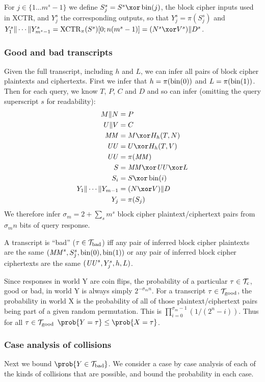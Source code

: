 \documentclass[hctr.tex]{subfiles}
\begin{document}
For \(j \in \{1 \ldots m^s-1\}\) we define \(S_j^s = S^s \xor \fromint(j)\),
the block cipher inputs used in XCTR, and \(Y_j^s\) the corresponding
outputs, so that \(Y_j^s = \pi(S_j^s)\) and 
\(Y_1^s \Concat \cdots \Concat Y_{m^s-1}^s = \XCTR_\pi(S^s)[0;n(m^s -1)] 
= (N^s \xor V^s) \Concat D^s\).

\subsubsection{Good and bad transcripts}
Given the full transcript, including \(h\) and \(L\),
we can infer all pairs of block cipher plaintexts and ciphertexts.
First we infer that \(h = \pi(\operatorname{bin}(0))\) and \(L = \pi(\operatorname{bin}(1))\).
Then for each query, we know \(T\), \(P\), \(C\) and \(D\)
and so can infer
(omitting the query superscript \(s\) for readability):
\begin{align*}
    M \Concat N &= P \\
    U \Concat V &= C \\
    \MM &= M \xor H_h(T, N)\\
    \UU &= U \xor H_h(T, V)\\
    \UU &= \pi(\MM)\\
    S &= \MM \xor \UU \xor L\\ 
    S_i &= S \xor \fromint(i)\\
    Y_1 \Concat \cdots \Concat Y_{m-1} &= (N \xor V) \Concat D \\
    Y_j &= \pi(S_j) \\
\end{align*}
We therefore infer \(\sigma_m = 2 + \sum_s m^s \) block cipher
plaintext/ciphertext pairs from \(\sigma_m n\) bits of query response.

A transcript is ``bad'' (\(\tau \in \mathcal{T}_\mathrm{bad}\)) iff any pair of 
inferred block cipher plaintexts are the same
\((\mathit{MM}^s, S_j^s, \operatorname{bin}(0), \operatorname{bin}(1))\)
or any pair of inferred block cipher ciphertexts are the same
\((\mathit{UU}^s, Y_j^s, h, L)\).

Since responses in world Y are coin flips,
the probability of a 
particular \(\tau \in \mathcal{T}_\mathrm{c}\), good or bad,
in world Y is always simply \(2^{-\sigma_m n}\).
For a transcript \(\tau \in \mathcal{T}_\mathrm{good}\),
the probability in world X
is the probability of all of those plaintext/ciphertext
pairs being part of a given random permutation.
This is 
\(\prod_{i=0}^{\sigma_m -1}(1/(2^n - i))\).
Thus for all \(\tau \in \mathcal{T}_\mathrm{good}\)
\(\prob{Y = \tau} \leq \prob{X = \tau}\). 

\subsubsection{Case analysis of collisions}
Next we bound \(\prob{Y \in \Tb}\).
We consider a case by case analysis of
each of the kinds of collisions that are
possible, and bound the probability in each case.
\end{document}
